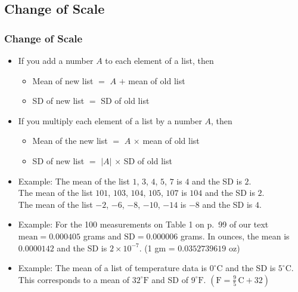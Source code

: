 \documentclass[t]{beamer}
\begin{document}
\subsection{Change of Scale}
\begin{frame}[t]\frametitle{Change of Scale}

{\small
\begin{itemize}
\item If you add a number $A$ to each element of a list, then 
   \begin{itemize}
   \item  Mean of new list $=$ $A$ $+$ mean of old list
   \item  SD of new list $=$ SD of old list
   \end{itemize}
\item If you multiply each element of a list by a number $A$, then
   \begin{itemize}
   \item Mean of the new list $=$ $A$ $\times$ mean of old list
   \item SD of new list $=$ $|A|$ $\times$ SD of old list
   \end{itemize}
\item Example:  The mean of the list {\color{blue}$1$, $3$,  $4$, $5$, $7$} is $4$ and the 
          SD is $2$.\\[-10pt]
\hphantom{Example: } The mean of the list {\color{blue}$101$, $103$, $104$, $105$, $107$} 
  is  $104$ and the SD is $2$.\\[-10pt]
\hphantom{Example: } The mean of the list {\color{blue}$-2$, $-6$, $-8$, $-10$, $-14$}
  is $-8$ and the SD is $4$.
\item Example:  For the 100 measurements on Table 1 on p.~99 of our
  text $\mbox{mean}=0.000405$ grams and  $\mbox{SD}=0.000006$ grams.  In ounces,
  the mean is $0.0000142$ and the SD is $2\times 10^{-7}$.
  (1 gm = $0.0352739619$ oz)
\item Example:  The mean of a list of temperature data is $0^{\circ}\mbox{C}$
and the SD is $5^{\circ}\mbox{C}$. This corresponds to a 
  mean of $32^{\circ}\mbox{F}$ and SD of $9^{\circ}\mbox{F}$. 
$\left(\mbox{F}=\frac{9}{5}\,\mbox{C} + 32\right)$
\end{itemize}
}
\label{lastpage}
\end{frame}
\end{document}
